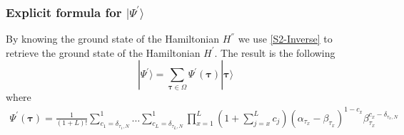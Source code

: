 \documentclass[10pt]{article}
\numberwithin{equation}{section}
\numberwithin{equation}{subsection}
\newcommand{\dt}{\;.}
\begin{document}
\subsubsection{Explicit formula for $|\Psi^{'}\rangle$}\label{subsectionSSdual}
By knowing the ground state  of the Hamiltonian $H^{''}$ we use \eqref{S2-Inverse} to retrieve the ground state of the Hamiltonian $H^{'}$. The result is the following 
\begin{equation}\label{ABS-vect}
    |\Psi^{'}\rangle =\sum_{\bm{\tau}\in \Omega}\Psi^{'}(\bm{\tau})|\bm{\tau}\rangle 
\end{equation}
where  
\begin{equation}\label{ABS}
		\begin{split}
			\Psi^{'}(\bm{\tau})=\frac{1}{(1+L)!}\sum_{c_{1}=\delta_{\tau_{1},N}}^{1}\ldots\sum_{c_{L}=\delta_{\tau_{L},N}}^{1}\prod_{x=1}^{L}\left(1+\sum_{j=x}^{L}c_{j}\right)(\alpha_{\tau_{x}}-\beta_{\tau_{x}})^{1-c_{x}}\beta_{\tau_{x}}^{c_{x}-\delta_{\tau_{x},N}}
		\end{split}
	\end{equation} 
\begin{comment}
{\color{blue}
	\begin{equation}
		\Psi^{'}(\bm{\tau})=\frac{1}{(1+L)!}\sum_{c_{1}=0}^{1-\delta_{\tau_{1},N}}\ldots\sum_{c_{L}=0}^{1-\delta_{\tau_{L},N}}\prod_{x=1}^{L}(\alpha_{\tau_{x}}-\beta_{\tau_{x}})^{c_{x}}\left(2+L-x-\sum_{j=x}^{L}c_{j}\right)\beta_{\tau_{x}}^{(1-c_{x}-\delta_{\tau_{x},N})}
	\end{equation}
\begin{equation}
	\Psi^{'}(\bm{\tau})=\sum_{c_{1}=0}^{1-\delta_{\tau_{1},N}}\ldots\sum_{c_{L}=0}^{1-\delta_{\tau_{L},N}}\frac{\Gamma(2+L-\sum_{z=1}^{L}c_{z})}{\Gamma(L+2)}\prod_{x=1}^{L}\left((\alpha_{\tau_{x}}-\beta_{\tau_{x}})\left(2+L-x-\sum_{j=x}^{L}c_{j}\right)\right)^{c_{x}}\beta_{\tau_{x}}^{(1-c_{x})(1-\delta_{\tau_{x},N})}\dt
\end{equation}
	\begin{equation}
		\Psi^{'}(\bm{\tau})=\frac{1}{(1+L)!}\sum_{c_{1}=0}^{1-\delta_{\tau_{1},N}}\ldots\sum_{c_{L}=0}^{1-\delta_{\tau_{L},N}}\prod_{x=1}^{L}\left(\frac{(\alpha_{\tau_{x}}-\beta_{\tau_{x}})}{\beta_{\tau_x}}\right)^{c_{x}}\left(2+L-x-\sum_{j=x}^{L}c_{j}\right)\beta_{\tau_{x}}^{1-\delta_{\tau_{x},N} }
	\end{equation}
}
\end{comment}
\end{document}
